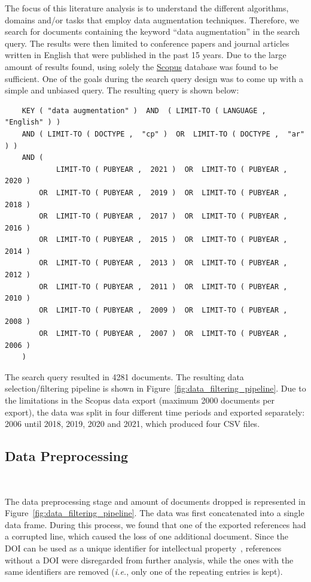 \documentclass[parskip=full]{scrartcl}
\begin{document}
The focus of this literature analysis is to understand the different
algorithms, domains and/or tasks that employ data augmentation techniques.
Therefore, we search for documents containing the keyword ``data
augmentation'' in the search query. The results were then limited to
conference papers and journal articles written in English that were published
in the past 15 years.  Due to the large amount of results found, using solely
the \href{https://www.scopus.com/}{Scopus} database was found to be
sufficient. One of the goals during the search query design was to come up
with a simple and unbiased query. The resulting query is shown below:

\begin{verbatim}
    KEY ( "data augmentation" )  AND  ( LIMIT-TO ( LANGUAGE ,  "English" ) )  
    AND ( LIMIT-TO ( DOCTYPE ,  "cp" )  OR  LIMIT-TO ( DOCTYPE ,  "ar" ) )  
    AND (
            LIMIT-TO ( PUBYEAR ,  2021 )  OR  LIMIT-TO ( PUBYEAR ,  2020 )  
        OR  LIMIT-TO ( PUBYEAR ,  2019 )  OR  LIMIT-TO ( PUBYEAR ,  2018 )  
        OR  LIMIT-TO ( PUBYEAR ,  2017 )  OR  LIMIT-TO ( PUBYEAR ,  2016 )  
        OR  LIMIT-TO ( PUBYEAR ,  2015 )  OR  LIMIT-TO ( PUBYEAR ,  2014 )  
        OR  LIMIT-TO ( PUBYEAR ,  2013 )  OR  LIMIT-TO ( PUBYEAR ,  2012 )  
        OR  LIMIT-TO ( PUBYEAR ,  2011 )  OR  LIMIT-TO ( PUBYEAR ,  2010 )  
        OR  LIMIT-TO ( PUBYEAR ,  2009 )  OR  LIMIT-TO ( PUBYEAR ,  2008 )  
        OR  LIMIT-TO ( PUBYEAR ,  2007 )  OR  LIMIT-TO ( PUBYEAR ,  2006 ) 
    )  
\end{verbatim}

The search query resulted in 4281 documents. The resulting data
selection/filtering pipeline is shown in
Figure~\ref{fig:data_filtering_pipeline}. Due to the limitations in the Scopus
data export (maximum 2000 documents per export), the data was split in four
different time periods and exported separately: 2006 until 2018, 2019, 2020
and 2021, which produced four CSV files.

\subsection{Data Preprocessing}~\label{sec:data_preprocessing}

The data preprocessing stage and amount of documents dropped is represented in
Figure~\ref{fig:data_filtering_pipeline}. The data was first concatenated into
a single data frame. During this process, we found that one of the exported
references had a corrupted line, which caused the loss of one additional
document.  Since the DOI can be used as a unique identifier for intellectual
property~\cite{Paskin1999}, references without a DOI were disregarded from
further analysis, while the ones with the same identifiers are removed
(\textit{i.e.}, only one of the repeating entries is kept).
\end{document}
